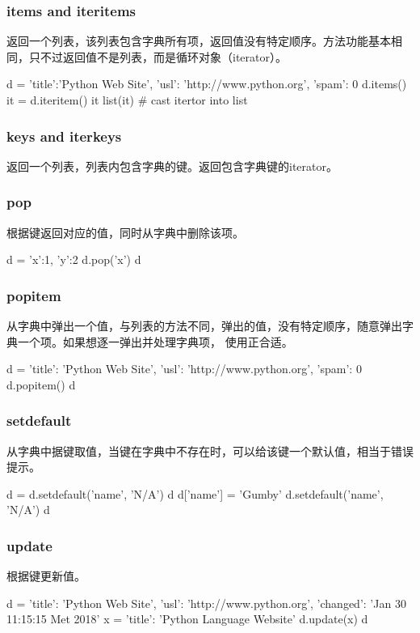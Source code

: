 \subsubsection{items and iteritems}
返回一个列表，该列表包含字典所有项，返回值没有特定顺序。方法功能基本相同，只不过返回值不是列表，而是循环对象（iterator）。
\begin{python}
  d = { 'title':'Python Web Site', 'usl': 'http://www.python.org', 'spam': 0 }
  d.items()
  it = d.iteritem()
  it
  list(it)  # cast itertor into list
\end{python}
\subsubsection{keys and iterkeys}
返回一个列表，列表内包含字典的键。返回包含字典键的iterator。
\subsubsection{pop}
根据键返回对应的值，同时从字典中删除该项。
\begin{python}
d = {'x':1, 'y':2}
d.pop('x')
d
\end{python}
\subsubsection{popitem}
从字典中弹出一个值，与列表的方法不同，弹出的值，没有特定顺序，随意弹出字典一个项。如果想逐一弹出并处理字典项， 使用正合适。
\begin{python}
d = {
    'title': 'Python Web Site',
    'usl': 'http://www.python.org',
    'spam': 0
}
d.popitem()
d
\end{python}
\subsubsection{setdefault}
从字典中据键取值，当键在字典中不存在时，可以给该键一个默认值，相当于错误提示。
\begin{python}
d = {}
d.setdefault('name', 'N/A')
d
d['name'] = 'Gumby'
d.setdefault('name', 'N/A')
d
\end{python}
\subsubsection{update}
根据键更新值。
\begin{python}
d = {
    'title': 'Python Web Site',
    'usl': 'http://www.python.org',
    'changed': 'Jan 30 11:15:15 Met 2018'
  }
  x = {'title': 'Python Language Website'}
  d.update(x)
  d
\end{python}
